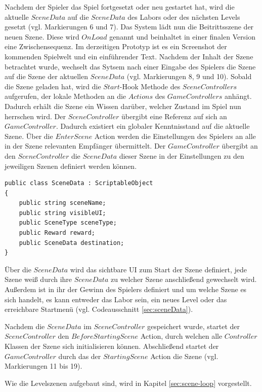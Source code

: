 Nachdem der Spieler das Spiel fortgesetzt oder neu gestartet hat, wird die aktuelle $SceneData$ auf die $SceneData$ des Labors oder des nächsten Levels gesetzt (vgl. Markierungen 6 und 7). Das System lädt nun die Beitrittsszene der neuen Szene. Diese wird $OnLoad$ genannt und beinhaltet in einer finalen Version eine Zwischensequenz. Im derzeitigen Prototyp ist es ein Screenshot der kommenden Spielwelt und ein einführender Text. Nachdem der Inhalt der Szene betrachtet wurde, wechselt das Sytsem nach einer Eingabe des Spielers die Szene auf die Szene der aktuellen $SceneData$ (vgl. Markierungen 8, 9 und 10). Sobald die Szene geladen hat, wird die $Start$-Hook Methode des $SceneControllers$ aufgerufen, der lokale Methoden an die $Actions$ des $GameControllers$ anhängt. Dadurch erhält die Szene ein Wissen darüber, welcher Zustand im Spiel nun herrschen wird. Der $SceneController$ übergibt eine Referenz auf sich an $GameController$. Dadurch existiert ein globaler Kenntnisstand auf die aktuelle Szene. Über die $EnterScene$ Action werden die Einstellungen des Spielers an alle in der Szene relevanten Empfänger übermittelt. Der $GameController$ übergibt an den $SceneController$ die $SceneData$ dieser Szene in der Einstellungen zu den jeweiligen Szenen definiert werden können.

\begin{lstlisting}[caption={SceneData.ts}, label={sec:sceneData}]
public class SceneData : ScriptableObject
{
    public string sceneName;
    public string visibleUI;
    public SceneType sceneType;
    public Reward reward;
    public SceneData destination;
}
\end{lstlisting}

Über die $SceneData$ wird das sichtbare \ac{UI} zum Start der Szene definiert, jede Szene weiß durch ihre $SceneData$ zu welcher Szene anschließend gewechselt wird. Außerdem ist in ihr der Gewinn des Spielers definiert und um welche Szene es sich handelt, es kann entweder das Labor sein, ein neues Level oder das erreichbare Startmenü (vgl. Codeausschnitt \ref{sec:sceneData}).

Nachdem die $SceneData$ im $SceneController$ gespeichert wurde, startet der $SceneController$ den $BeforeStartingScene$ Action, durch welchen alle $Controller$ Klassen der Szene sich initialisieren können. Abschließend startet der $GameController$ durch das  der $StartingScene$ Action die Szene (vgl. Markierungen 11 bis 19). 

Wie die Levelszenen aufgebaut sind, wird in Kapitel \ref{sec:scene-loop}  vorgestellt.

